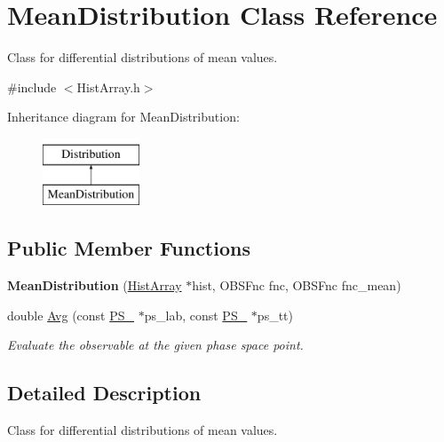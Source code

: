 \hypertarget{classMeanDistribution}{}\section{Mean\+Distribution Class Reference}
\label{classMeanDistribution}


Class for differential distributions of mean values.  




{\ttfamily \#include $<$Hist\+Array.\+h$>$}

Inheritance diagram for Mean\+Distribution\+:\begin{figure}[H]
\begin{center}
\leavevmode
\includegraphics[height=2.000000cm]{classMeanDistribution}
\end{center}
\end{figure}
\subsection*{Public Member Functions}
\begin{DoxyCompactItemize}
\item 
\hypertarget{classMeanDistribution_a4cf60c5fcc4da56771b9e62395c89b2f}{}{\bfseries Mean\+Distribution} (\hyperlink{classHistArray}{Hist\+Array} $\ast$hist, O\+B\+S\+Fnc fnc, O\+B\+S\+Fnc fnc\+\_\+mean)\label{classMeanDistribution_a4cf60c5fcc4da56771b9e62395c89b2f}

\item 
double \hyperlink{classMeanDistribution_a75dbc9555e8b6777ddd6da84800633ea}{Avg} (const \hyperlink{classPS__2}{P\+S\+\_} $\ast$ps\+\_\+lab, const \hyperlink{classPS__2}{P\+S\+\_} $\ast$ps\+\_\+tt)
\begin{DoxyCompactList}\small\item\em Evaluate the observable at the given phase space point. \end{DoxyCompactList}\end{DoxyCompactItemize}


\subsection{Detailed Description}
Class for differential distributions of mean values. 


